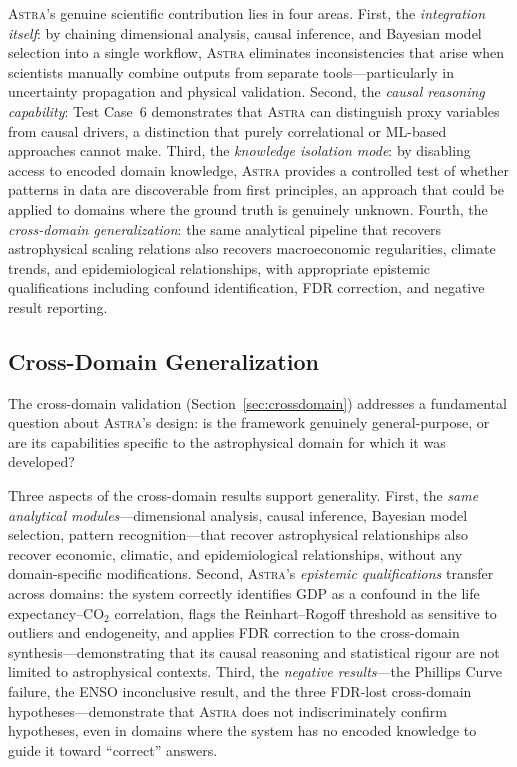\documentclass[usenatbib]{rasti}
\newcommand{\astra}{\textsc{Astra}\xspace}
\begin{document}
\astra's genuine scientific contribution lies in four areas.
First, the \emph{integration itself}: by chaining dimensional analysis, causal inference, and Bayesian model selection into a single workflow, \astra eliminates inconsistencies that arise when scientists manually combine outputs from separate tools---particularly in uncertainty propagation and physical validation.
Second, the \emph{causal reasoning capability}: Test Case~6 demonstrates that \astra can distinguish proxy variables from causal drivers, a distinction that purely correlational or ML-based approaches cannot make.
Third, the \emph{knowledge isolation mode}: by disabling access to encoded domain knowledge, \astra provides a controlled test of whether patterns in data are discoverable from first principles, an approach that could be applied to domains where the ground truth is genuinely unknown.
Fourth, the \emph{cross-domain generalization}: the same analytical pipeline that recovers astrophysical scaling relations also recovers macroeconomic regularities, climate trends, and epidemiological relationships, with appropriate epistemic qualifications including confound identification, FDR correction, and negative result reporting.

\subsection{Cross-Domain Generalization}
\label{sec:discussion:crossdomain}

The cross-domain validation (Section~\ref{sec:crossdomain}) addresses a fundamental question about \astra's design: is the framework genuinely general-purpose, or are its capabilities specific to the astrophysical domain for which it was developed?

Three aspects of the cross-domain results support generality.
First, the \emph{same analytical modules}---dimensional analysis, causal inference, Bayesian model selection, pattern recognition---that recover astrophysical relationships also recover economic, climatic, and epidemiological relationships, without any domain-specific modifications.
Second, \astra's \emph{epistemic qualifications} transfer across domains: the system correctly identifies GDP as a confound in the life expectancy--CO$_{2}$ correlation, flags the Reinhart--Rogoff threshold as sensitive to outliers and endogeneity, and applies FDR correction to the cross-domain synthesis---demonstrating that its causal reasoning and statistical rigour are not limited to astrophysical contexts.
Third, the \emph{negative results}---the Phillips Curve failure, the ENSO inconclusive result, and the three FDR-lost cross-domain hypotheses---demonstrate that \astra does not indiscriminately confirm hypotheses, even in domains where the system has no encoded knowledge to guide it toward ``correct'' answers.
\end{document}
